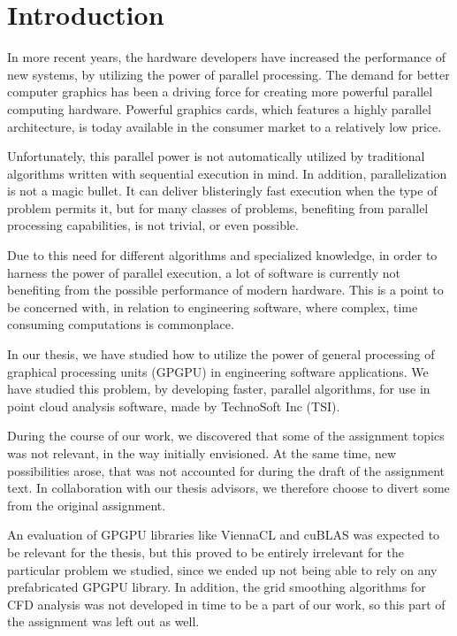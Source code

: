 \chapter{Introduction}

In more recent years, the hardware developers have increased the performance of new systems, by utilizing the power of parallel processing. The demand for better computer graphics has been a driving force for creating more powerful parallel computing hardware. Powerful graphics cards, which features a highly parallel architecture, is today available in the consumer market to a relatively low price.

Unfortunately, this parallel power is not automatically utilized by traditional algorithms written with sequential execution in mind. In addition, parallelization is not a magic bullet. It can deliver blisteringly fast execution when the type of problem permits it, but for many classes of problems, benefiting from parallel processing capabilities, is not trivial, or even possible.

Due to this need for different algorithms and specialized knowledge, in order to harness the power of parallel execution, a lot of software is currently not benefiting from the possible performance of modern hardware. This is a point to be concerned with, in relation to engineering software, where complex, time consuming computations is commonplace.

In our thesis, we have studied how to utilize the power of general processing of graphical processing units (GPGPU) in engineering software applications. We have studied this problem, by developing faster, parallel algorithms, for use in point cloud analysis software, made by TechnoSoft Inc (TSI).

During the course of our work, we discovered that some of the assignment topics was not relevant, in the way initially envisioned. At the same time, new possibilities arose, that was not accounted for during the draft of the assignment text. In collaboration with our thesis advisors, we therefore choose to divert some from the original assignment.

An evaluation of GPGPU libraries like ViennaCL and cuBLAS was expected to be relevant for the thesis, but this proved to be entirely irrelevant for the particular problem we studied, since we ended up not being able to rely on any prefabricated GPGPU library. In addition, the grid smoothing algorithms for CFD analysis was not developed in time to be a part of our work, so this part of the assignment was left out as well.
